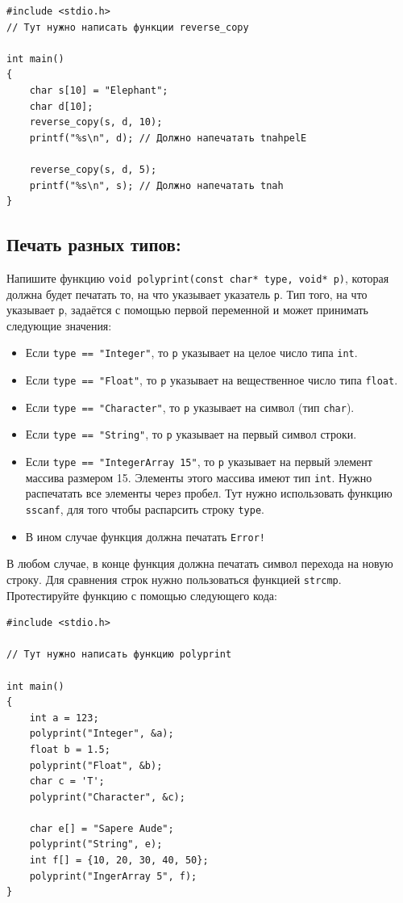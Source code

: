 \documentclass{article}
\begin{document}
\begin{lstlisting}
#include <stdio.h>
// Тут нужно написать функции reverse_copy

int main() 
{
    char s[10] = "Elephant";
    char d[10];
    reverse_copy(s, d, 10);
    printf("%s\n", d); // Должно напечатать tnahpelE
    
    reverse_copy(s, d, 5);
    printf("%s\n", s); // Должно напечатать tnah
}
\end{lstlisting}


\newpage
\subsection{Печать разных типов:}
Напишите функцию \texttt{void polyprint(const char* type, void* p)}, которая должна будет печатать то, на что указывает указатель \texttt{p}. Тип того, на что указывает \texttt{p}, задаётся с помощью первой переменной и может принимать следующие значения:
\begin{itemize}
\item Если \texttt{type == "Integer"}, то \texttt{p} указывает на целое число типа \texttt{int}.
\item Если \texttt{type == "Float"}, то \texttt{p} указывает на вещественное число типа \texttt{float}.
\item Если \texttt{type == "Character"}, то \texttt{p} указывает на символ (тип \texttt{char}).
\item Если \texttt{type == "String"}, то \texttt{p} указывает на первый символ строки.
\item Если \texttt{type == "IntegerArray 15"}, то \texttt{p} указывает на первый элемент массива размером 15. Элементы этого массива имеют тип \texttt{int}. Нужно распечатать все элементы через пробел. Тут нужно использовать функцию \texttt{sscanf}, для того чтобы распарсить строку \texttt{type}.
\item В ином случае функция должна печатать \texttt{Error!}
\end{itemize}
В любом случае, в конце функция должна печатать символ перехода на новую строку. Для сравнения строк нужно пользоваться функцией \texttt{strcmp}. Протестируйте функцию с помощью следующего кода:

\begin{lstlisting}
#include <stdio.h>

// Тут нужно написать функцию polyprint

int main() 
{
    int a = 123;
    polyprint("Integer", &a);
    float b = 1.5;
    polyprint("Float", &b);
    char c = 'T';
    polyprint("Character", &c);
    
    char e[] = "Sapere Aude";
    polyprint("String", e);
    int f[] = {10, 20, 30, 40, 50};
    polyprint("IngerArray 5", f);
}
\end{lstlisting}
\end{document}
